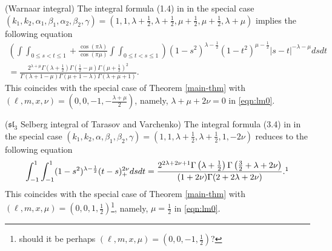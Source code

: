 \documentclass[12pt]{article}
\numberwithin{equation}{section}
\newcommand{\comma}{{,}}
\begin{document}
\begin{example}
  \label{ex:2}(Warnaar integral) The integral formula (1.4) in
  {\cite{warnaar2010sl3}} in the special case $(k_1, k_2, \alpha_1, \beta_1,
  \alpha_2 \comma \beta_2, \gamma) = \left( 1, 1, \lambda + \frac{1}{2},
  \lambda + \frac{1}{2}, \mu + \frac{1}{2}, \mu + \frac{1}{2} \comma \lambda +
  \mu \right)$ implies the following equation
  \begin{multline}
     \left( \displaystyle\int \displaystyle\int_{0 \leqslant s < t
    \leqslant 1} + \frac{\cos (\pi \lambda)}{\cos (\pi \mu)} \displaystyle\int \displaystyle\int_{0
    \leqslant t < s \leqslant 1} \right) (1 - s^2)^{\lambda - \frac{1}{2}} (1
    - t^2)^{\mu - \frac{1}{2}} | s - t |^{- \lambda - \mu} d s d t
    \\
    \displaystyle= \frac{{2^{\lambda + \mu}}\Gamma \left( \lambda + \frac{1}{2} \right) \Gamma \left(
    \frac{1}{2} - \mu \right) \Gamma \left( \mu + \frac{1}{2}
    \right)^2}{\Gamma (\lambda + 1 - \mu) \Gamma (\mu + 1 - \lambda) \Gamma
    (\lambda + \mu + 1)}.
      \label{eqn:spec_warnaar}
  \end{multline}
  This coincides with the special case of Theorem \ref{main-thm} with $(\ell,
  m, x, \nu) = \left( 0, 0, -1, - \frac{\lambda + \mu}{2} \right)$, namely,
  $\lambda+\mu+2\nu=0$ in
  \eqref{eqn:lm0}.
\end{example}

\begin{example}
  \label{ex:3}($\mathfrak{s}\mathfrak{l}_3$ Selberg integral of Tarasov and
  Varchenko) The integral formula (3.4) in {\cite{tarasov2003selberg}} in the
  special case $(k_1, k_2, \alpha, \beta_1, \beta_2, \gamma) = \left( 1, 1,
  \lambda + \frac{1}{2}, \lambda + \frac{1}{2}, 1, - 2 \nu \right)$ reduces to
  the following equation
  \begin{equation}
    \displaystyle\displaystyle\int_{- 1}^1 \displaystyle\int_{- 1}^1 (1 -
    s^2)^{\lambda - \frac{1}{2}} (t - s)_+^{2 \nu} d s d t = \frac{2^{2\lambda+2\nu+1}\Gamma
    \left( \lambda + \frac{1}{2} \right) \Gamma \left( \frac{3}{2} + \lambda +
2 \nu \right)}{(1 + 2 \nu) \Gamma (2 + 2 \lambda + 2 \nu)} \mbox{.\footnotemark}
\label{eqn:spec_tv}
  \end{equation}
  This coincides with the special case of Theorem \ref{main-thm} with $(\ell,
  m, x, \mu) = \left( 0, 0, 1, \frac{1}{2} \right)$\footnote{should it be perhaps $(\ell,
  m, x, \mu) = \left( 0, 0, -1, \frac{1}{2} \right)$?}, namely, $\mu=\frac{1}{2}$ in \eqref{eqn:lm0}.
\end{example}
\end{document}
